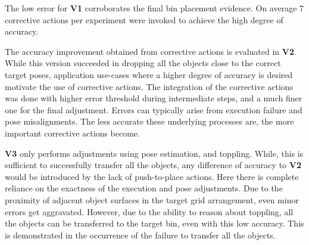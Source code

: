 


The low error for \textbf{V1} corroborates the final bin placement evidence. On average $7$  corrective actions per experiment were invoked to achieve the high degree of accuracy.

The accuracy improvement obtained from corrective actions is evaluated in \textbf{V2}. While this version succeeded in dropping all the objects close to the correct target poses, application use-cases where a higher degree of accuracy is desired motivate the use of corrective actions. The integration of the corrective actions was done with higher error threshold during intermediate steps, and a much finer one for the final adjustment. Errors can typically arise from execution failure and pose misalignments. The less accurate these underlying processes are, the more important corrective actions become. 

\textbf{V3} only performs adjustments using pose estimation, and toppling. While, this is sufficient to successfully transfer all the objects, any difference of accuracy to \textbf{V2} would be introduced by the lack of push-to-place actions. Here there is complete reliance on the exactness of the execution and pose adjustments. Due to the proximity of adjacent object surfaces in the target grid arrangement, even minor errors get aggravated. However, due to the ability to reason about toppling, all the objects can be transferred to the target bin, even with this low accuracy. This is demonstrated in the occurrence of the failure to transfer all the objects. 

